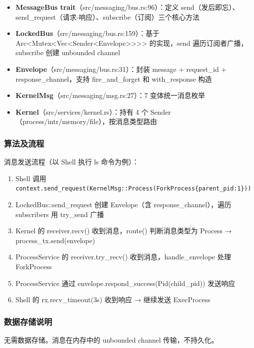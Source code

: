 \documentclass[UTF8,a4paper,12pt]{ctexart}
\begin{document}
\begin{itemize}
    \item \textbf{MessageBus trait}（src/messaging/bus.rs:96）：定义 send（发后即忘）、send\_request（请求-响应）、subscribe（订阅）三个核心方法
    \item \textbf{LockedBus}（src/messaging/bus.rs:159）：基于 Arc<Mutex<Vec<Sender<Envelope>>>> 的实现，send 遍历订阅者广播，subscribe 创建 unbounded channel
    \item \textbf{Envelope}（src/messaging/bus.rs:31）：封装 message + request\_id + response\_channel，支持 fire\_and\_forget 和 with\_response 构造
    \item \textbf{KernelMsg}（src/messaging/msg.rs:27）：7 变体统一消息枚举
    \item \textbf{Kernel}（src/services/kernel.rs）：持有 4 个 Sender（process/intr/memory/file），按消息类型路由
\end{itemize}

\subsubsection{算法及流程}

消息发送流程（以 Shell 执行 ls 命令为例）：

\begin{enumerate}[label=(\arabic*)]
    \item Shell 调用 \texttt{context.send\_request(KernelMsg::Process(ForkProcess\{parent\_pid:1\}))}
    \item LockedBus::send\_request 创建 Envelope（含 response\_channel），遍历 subscribers 用 try\_send 广播
    \item Kernel 的 receiver.recv() 收到消息，route() 判断消息类型为 Process → process\_tx.send(envelope)
    \item ProcessService 的 receiver.try\_recv() 收到消息，handle\_envelope 处理 ForkProcess
    \item ProcessService 通过 envelope.respond\_success(Pid(child\_pid)) 发送响应
    \item Shell 的 rx.recv\_timeout(3s) 收到响应 → 继续发送 ExecProcess
\end{enumerate}

\subsubsection{数据存储说明}

无需数据存储。消息在内存中的 unbounded channel 传输，不持久化。
\end{document}
